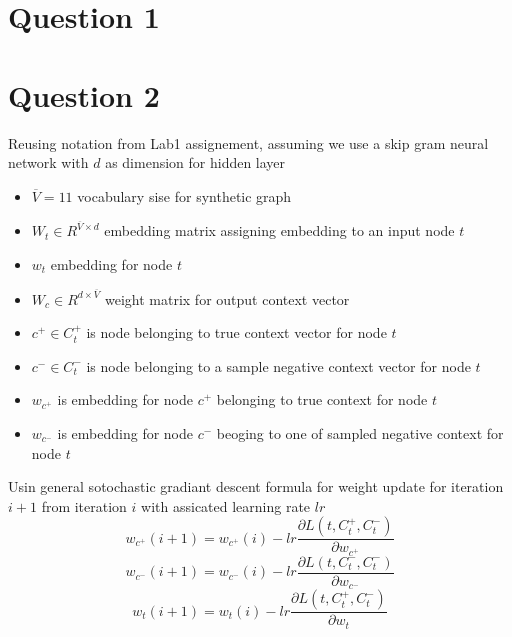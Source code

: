 \documentclass[a4paper]{article}
\begin{document}



\section{Question 1}


\section{Question 2}

Reusing notation from Lab1 assignement, assuming we use a skip gram neural network with $d$ as dimension for hidden layer
\begin{itemize}
\item $\overline{V} = 11$ vocabulary sise for synthetic graph 
\item $W_{t} \in R^{\overline{V} \times d}$ embedding matrix assigning embedding to an input node $t$
\item $w_{t}$ embedding for node $t$
\item $W_{c} \in R^{d \times \overline{V}}$ weight matrix for output context vector
\item $c^{+} \in C_{t}^{+}$ is node belonging to true context vector for node $t$
\item $c^{-} \in C_{t}^{-}$ is node belonging to a sample negative context vector for node $t$
 \item $w_{c^{+}}$ is embedding for node $c^{+}$ belonging to true context for node $t$  
 \item $w_{c^{-}}$ is embedding for node $c^{-}$ beoging to one of sampled negative context for node $t$
\end{itemize}

Usin general sotochastic gradiant descent formula for weight update for iteration $i+1$ from iteration $i$ with assicated learning rate $lr$
\begin{equation}
w_{c^{+}}(i+1) = w_{c^{+}}(i) -lr \frac{\partial L(t, C_{t}^{+},C_{t}^{-})}{\partial w_{c^{+}}}
\end{equation}
\begin{equation}
w_{c^{-}}(i+1) = w_{c^{-}}(i) -lr \frac{\partial L(t, C_{t}^{-},C_{t}^{-})}{\partial w_{c^{-}}}
\end{equation}
\begin{equation}
w_{t}(i+1) = w_{t}(i) -lr \frac{\partial L(t, C_{t}^{+},C_{t}^{-})}{\partial w_{t}}
\end{equation}
\end{document}
